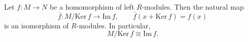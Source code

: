 Let $f: M \to N$ be a homomorphism of left $R$-modules. Then the natural map
$$\bar{f}: M / \text{Ker}\, f \to \text{Im}\, f, \qquad \bar{f}(x + \text{Ker}\, f) = f(x)$$
is an isomorphism of $R$-modules. In particular,
$$M / \text{Ker}\, f \cong \text{Im}\, f.$$
